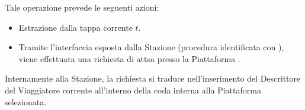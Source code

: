 	Tale operazione prevede le seguenti azioni:
		\begin{itemize}
			\item Estrazione  dalla tappa corrente $t$.
			\item Tramite l'interfaccia esposta dalla Stazione  (procedura identificata con ), viene effettuata una richiesta di attsa presso la Piattaforma .
		\end{itemize} 
		
	Internamente alla Stazione, la richiesta si traduce nell'inserimento del Descrittore del Viaggiatore corrente all'interno della coda  interna alla Piattaforma  selezionata.
	


\newpage
	
